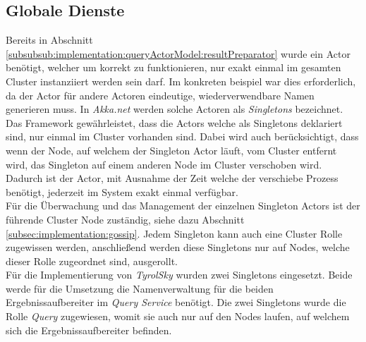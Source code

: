 \subsection{Globale Dienste}
\label{subsec:implementation:singeltons}
Bereits in Abschnitt \ref{subsubsub:implementation:queryActorModel:resultPreparator} wurde ein Actor benötigt, welcher um korrekt zu funktionieren, nur exakt einmal im gesamten Cluster instanziiert werden sein darf. Im konkreten beispiel war dies erforderlich, da der Actor für andere Actoren eindeutige, wiederverwendbare Namen generieren muss. In \textit{Akka.net} werden solche Actoren als \textit{Singletons} bezeichnet. Das Framework gewährleistet, dass die Actors welche als Singletons deklariert sind, nur einmal im Cluster vorhanden sind. Dabei wird auch berücksichtigt, dass wenn der Node, auf welchem der Singleton Actor läuft, vom Cluster entfernt wird, das Singleton auf einem anderen Node im Cluster verschoben wird. Dadurch ist der Actor, mit Ausnahme der Zeit welche der verschiebe Prozess benötigt, jederzeit im System exakt einmal verfügbar. \\
Für die Überwachung und das Management der einzelnen Singleton Actors ist der führende Cluster Node zuständig, siehe dazu Abschnitt \ref{subsec:implementation:gossip}. Jedem Singleton kann auch eine Cluster Rolle zugewissen werden, anschließend werden diese Singletons nur auf Nodes, welche dieser Rolle zugeordnet sind, ausgerollt. \\
Für die Implementierung von \textit{TyrolSky} wurden zwei Singletons eingesetzt. Beide werde für die Umsetzung die Namenverwaltung für die beiden Ergebnissaufbereiter im \textit{Query Service} benötigt.  Die zwei Singletons wurde die Rolle \textit{Query} zugewiesen,  womit sie auch nur auf den Nodes laufen, auf welchem sich die Ergebnissaufbereiter befinden.

